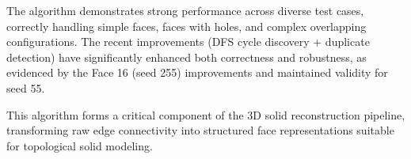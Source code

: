 \documentclass[11pt]{article}
\begin{document}
The algorithm demonstrates strong performance across diverse test cases, correctly handling simple faces, faces with holes, and complex overlapping configurations. The recent improvements (DFS cycle discovery + duplicate detection) have significantly enhanced both correctness and robustness, as evidenced by the Face 16 (seed 255) improvements and maintained validity for seed 55.

This algorithm forms a critical component of the 3D solid reconstruction pipeline, transforming raw edge connectivity into structured face representations suitable for topological solid modeling.
\end{document}
